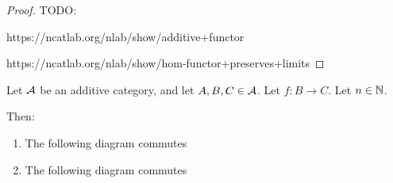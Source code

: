 \begin{proof}
    TODO: 
    
    https://ncatlab.org/nlab/show/additive+functor

    https://ncatlab.org/nlab/show/hom-functor+preserves+limits
\end{proof}


\begin{lemma} \label{thm:hom_direct_sum_map_nice}
    Let \( {\mathcal{A}} \) be an additive category, and let \( A, B, C \in {\mathcal{A}} \). Let \( f: B \to C \). Let \( n \in {\mathbb{N}} \).

    Then:
    \begin{enumerate}
        \item {
            The following diagram commutes
            \begin{center}
            \end{center}
        }
        \item {
            The following diagram commutes
            \begin{center}
\end{center}}
\end{enumerate}
\end{lemma}
